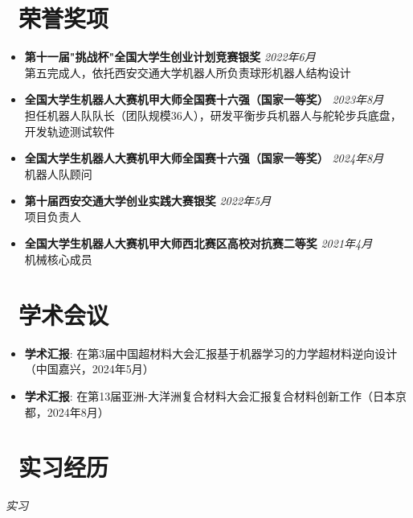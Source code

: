 \documentclass{resume}
\newcommand{\faconference}{\faComments}
\newcommand{\faachievement}{\faTrophy}
\begin{document}
\section{\faachievement\  荣誉奖项}
\begin{itemize}
  \item \textbf{第十一届"挑战杯"全国大学生创业计划竞赛银奖} \hfill \textit{2022年6月} \\
  第五完成人，依托西安交通大学机器人所负责球形机器人结构设计
  
  \item \textbf{全国大学生机器人大赛机甲大师全国赛十六强（国家一等奖）} \hfill \textit{2023年8月} \\
  担任机器人队队长（团队规模36人），研发平衡步兵机器人与舵轮步兵底盘，开发轨迹测试软件
  
  \item \textbf{全国大学生机器人大赛机甲大师全国赛十六强（国家一等奖）} \hfill \textit{2024年8月} \\
  机器人队顾问
  
  \item \textbf{第十届西安交通大学创业实践大赛银奖} \hfill \textit{2022年5月} \\
  项目负责人
  
  \item \textbf{全国大学生机器人大赛机甲大师西北赛区高校对抗赛二等奖} \hfill \textit{2021年4月} \\
  机械核心成员
  
\end{itemize}

\section{\faconference\  学术会议}
\begin{itemize}
  \item \textbf{学术汇报}: 在第3届中国超材料大会汇报基于机器学习的力学超材料逆向设计（中国嘉兴，2024年5月）
  \item \textbf{学术汇报}: 在第13届亚洲-大洋洲复合材料大会汇报复合材料创新工作（日本京都，2024年8月）
\end{itemize}

\section{\faBriefcase\  实习经历}
\textit{实习}
\end{document}
